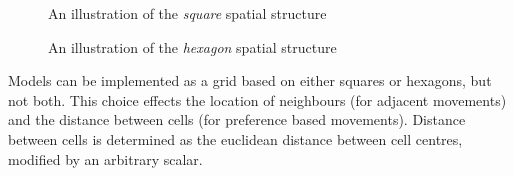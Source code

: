 \begin{figure}[htp]
 \centering
  \caption{An illustration of the \emph{square} spatial structure}
  \label{fig:SquareSpatialStructure}
\end{figure}

\begin{figure}[htp]
 \centering
  \caption{An illustration of the \emph{hexagon} spatial structure}
  \label{fig:HexagonSpatialStructure}
\end{figure}

Models can be implemented as a grid based on either squares or hexagons, but not both. This choice effects the location of neighbours (for adjacent movements) and the distance between cells (for preference based movements). Distance between cells is determined as the euclidean distance between cell centres, modified by an arbitrary scalar. 

